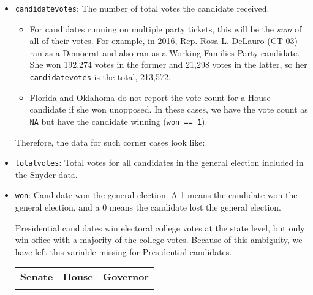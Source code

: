 \documentclass[12pt]{article}
\begin{document}
\begin{itemize}[leftmargin=*]
\begin{tabularx}{\linewidth}{C}
\textbf{House}\\
 
\end{tabularx}

\begin{tabularx}{\linewidth}{C}
\textbf{Governor}\\

\end{tabularx}

\item \texttt{candidatevotes}: The number of total votes the candidate received. 
\begin{itemize}
\item For candidates running on multiple party tickets, this will be the \emph{sum} of all of their votes.  For example, in 2016, Rep. Rosa L. DeLauro (CT-03) ran as a Democrat and also ran as a Working Families Party candidate. She won 192,274 votes in the former and 21,298 votes in the latter, so her \texttt{candidatevotes} is the total, 213,572.
\item  Florida and Oklahoma do not report the vote count for a House candidate if she won unopposed. In these cases, we have the vote count as \texttt{NA} but have the candidate winning (\texttt{won == 1}).
\end{itemize}

Therefore, the data for such corner cases look like:

\begin{table}[!h]
\centering
\footnotesize

\end{table}


\item \texttt{totalvotes}: Total votes for all candidates in the general election included in the Snyder data.  

\item \texttt{won}: Candidate won the general election. A 1 means the candidate won the general election, and a 0 means the candidate lost the general election. 

Presidential candidates win electoral college votes at the state level, but only win office with a majority of the college votes. Because of this ambiguity, we have left this variable missing for Presidential candidates.

    \begin{tabularx}{\linewidth}{CCC}
    \textbf{Senate} & \textbf{House} & \textbf{Governor}\\
     &  & 
    \end{tabularx}


\end{itemize}
\end{document}
